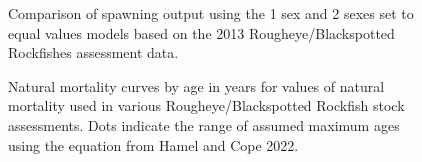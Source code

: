 \documentclass[
]{scrartcl}
\begin{document}
\begin{figure}[H]


\caption{\label{fig-Sex1vs2_Bratio}Comparison of spawning output using
the 1 sex and 2 sexes set to equal values models based on the 2013
Rougheye/Blackspotted Rockfishes assessment data.}

\end{figure}%

\begin{figure}[H]


\caption{\label{fig-Mcurves}Natural mortality curves by age in years for
values of natural mortality used in various Rougheye/Blackspotted
Rockfish stock assessments. Dots indicate the range of assumed maximum
ages using the equation from Hamel and Cope 2022.}

\end{figure}%
\end{document}
